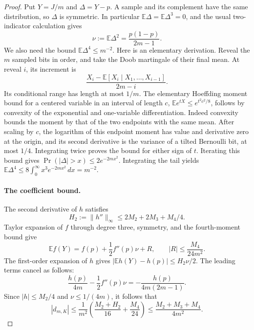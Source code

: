 \begin{proof}
Put $Y=J/m$ and $\Delta=Y-p$.  A sample and its complement have
the same distribution, so $\Delta$ is symmetric.  In particular
$\mathbb E\Delta=\mathbb E\Delta^3=0$, and the usual two-indicator
calculation gives
\[
 \nu:=\mathbb E\Delta^2=\frac{p(1-p)}{2m-1}.
\]
We also need the bound $\mathbb E\Delta^4\le m^{-2}$.
Here is an elementary derivation.  Reveal the $m$ sampled bits in
order, and take the Doob martingale of their final mean.  At reveal
$i$, its increment is
\[
 \frac{X_i-\mathbb E[X_i\mid X_1,\ldots,X_{i-1}]}{2m-i}.
\]
Its conditional range has length at most $1/m$.  The elementary
Hoeffding moment bound for a centered variable in an interval of
length $c$, $\mathbb E e^{tX}\le e^{t^2c^2/8}$, follows by
convexity of the exponential and one-variable differentiation.
Indeed convexity bounds the moment by that of the two endpoints
with the same mean.  After scaling by $c$, the logarithm of this
endpoint moment has value and derivative zero at the origin, and
its second derivative is the variance of a tilted Bernoulli bit,
at most $1/4$.  Integrating twice proves the bound for either sign
of $t$.
Iterating this bound gives
$\Pr(|\Delta|>x)\le2e^{-2mx^2}$.
Integrating the tail yields
$\mathbb E\Delta^4\le8\int_0^\infty x^3e^{-2mx^2}\,dx=m^{-2}$.

\paragraph{The coefficient bound.}
The second derivative of $h$ satisfies
\[
 H_2:=\|h''\|_\infty\le2M_2+2M_3+M_4/4.
\]
Taylor expansion of $f$ through degree three, symmetry, and the
fourth-moment bound give
\[
 \mathbb E f(Y)=f(p)+\frac12 f''(p)\nu+R,
 \qquad |R|\le\frac{M_4}{24m^2}.
\]
The first-order expansion of $h$ gives
$|\mathbb E h(Y)-h(p)|\le H_2\nu/2$.
The leading terms cancel as follows:
\[
 \frac{h(p)}{4m}-\frac12f''(p)\nu
 =-\frac{h(p)}{4m(2m-1)}.
\]
Since $|h|\le M_2/4$ and $\nu\le1/(4m)$, it follows that
\[
 |d_{m,K}|
 \le\frac1{m^2}\left(\frac{M_2+H_2}{16}+\frac{M_4}{24}\right)
 \le\frac{M_2+M_3+M_4}{4m^2}.
\]


\end{proof}
